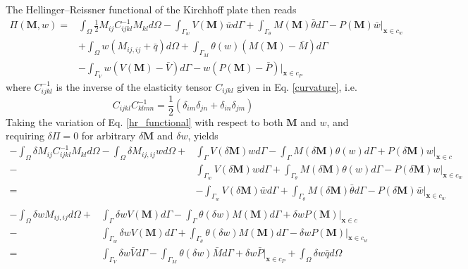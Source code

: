 The Hellinger--Reissner functional of the Kirchhoff plate then reads
\begin{equation}\label{hr_functional}
	\begin{aligned}
		\Pi(\boldsymbol M,w)=&\int_\Omega \frac{1}{2} M_{ij} C^{-1}_{ijkl} M_{kl} d\Omega
		-\int_{\Gamma_{w}} V(\boldsymbol M) \bar w d\Gamma
		+\int_{\Gamma_{\theta}} M(\boldsymbol M) \bar\theta d\Gamma
		-P(\boldsymbol M)\bar w\vert_{\boldsymbol x\in c_w} \\
		&+\int_\Omega w\left(M_{ij,ij}+\bar q\right)d\Omega
		+\int_{\Gamma_{M}} \theta(w)\left(M(\boldsymbol M)-\bar M\right)d\Gamma \\
		&-\int_{\Gamma_{V}} w\left(V(\boldsymbol M)-\bar V\right)d\Gamma
		-w\left(P(\boldsymbol M)-\bar P\right)\vert_{\boldsymbol x\in c_P}
	\end{aligned}
\end{equation}
where $C^{-1}_{ijkl}$ is the inverse of the elasticity tensor $C_{ijkl}$ given in Eq. \eqref{curvature}, i.e.
\begin{equation}\label{compliance}
	C_{ijkl}C^{-1}_{klmn}=\frac{1}{2}\left(\delta_{im}\delta_{jn}+\delta_{in}\delta_{jm}\right)
\end{equation}
Taking the variation of Eq. \eqref{hr_functional} with respect to both $\boldsymbol M$ and $w$, and requiring $\delta\Pi=0$ for arbitrary $\delta\boldsymbol M$ and $\delta w$, yields
\begin{equation}\label{hr_variation_M}
	\begin{aligned}
		-\int_\Omega \delta M_{ij} C^{-1}_{ijkl} M_{kl} d\Omega
		- \int_\Omega \delta M_{ij,ij}w d\Omega  
		+&\int_{\Gamma}V(\delta\boldsymbol M)wd\Gamma
		-\int_{\Gamma}M(\delta\boldsymbol M)\theta(w)d\Gamma
		+P(\delta\boldsymbol M)w\vert_{\boldsymbol x\in c} \\
		-&\int_{\Gamma_{w}}V(\delta\boldsymbol M)wd\Gamma
		+\int_{\Gamma_{\theta}}M(\delta\boldsymbol M)\theta(w)d\Gamma
		-P(\delta\boldsymbol M)w\vert_{\boldsymbol x\in c_w} \\=&
		-\int_{\Gamma_{w}}V(\delta\boldsymbol M)\bar w d\Gamma
		+\int_{\Gamma_{\theta}}M(\delta\boldsymbol M)\bar\theta d\Gamma
		-P(\delta\boldsymbol M)\bar w\vert_{\boldsymbol x\in c_w} \\
	\end{aligned}
\end{equation}
\begin{equation}\label{hr_variation_w}
	\begin{aligned}
		-\int_\Omega \delta wM_{ij,ij}d\Omega
		+&\int_{\Gamma}\delta wV(\boldsymbol M)d\Gamma
		-\int_{\Gamma}\theta(\delta w)M(\boldsymbol M)d\Gamma
		+\delta w P(\boldsymbol M)\vert_{\boldsymbol x\in c} \\
		-&\int_{\Gamma_{w}}\delta wV(\boldsymbol M)d\Gamma
		+\int_{\Gamma_{\theta}}\theta(\delta w)M(\boldsymbol M)d\Gamma
		-\delta w P(\boldsymbol M)\vert_{\boldsymbol x\in c_w} \\ =&
		\int_{\Gamma_{V}}\delta w\bar Vd\Gamma
		-\int_{\Gamma_{M}}\theta(\delta w)\bar Md\Gamma
		+\delta w\bar P\vert_{\boldsymbol x\in c_P}
		+\int_\Omega \delta w\bar qd\Omega
	\end{aligned}
\end{equation}
